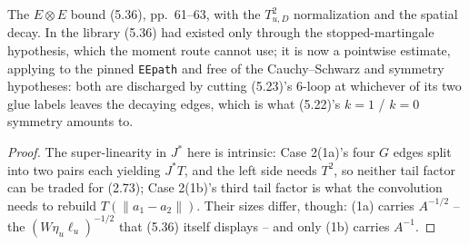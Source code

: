 \begin{lemma}\label{lem:5.7b}
  \leanok{}
  The $E\otimes E$ bound (5.36), pp.\ 61--63, with the $T_{u,D}^2$ normalization and the spatial
  decay.  In the library (5.36) had existed only through the stopped-martingale hypothesis, which
  the moment route cannot use; it is now a pointwise estimate, applying to the pinned
  \texttt{EEpath} and free of the Cauchy--Schwarz and symmetry hypotheses: both are discharged by
  cutting (5.23)'s 6-loop at whichever of its two glue labels leaves the decaying edges, which is
  what (5.22)'s $k=1$ / $k=0$ symmetry amounts to.
\end{lemma}
\begin{proof}\leanok
  The super-linearity in $J^*$ here is intrinsic: Case 2(1a)'s four $G$ edges split into two pairs
  each yielding $J^*T$, and the left side needs $T^2$, so neither tail factor can be traded for
  (2.73); Case 2(1b)'s third tail factor is what the convolution needs to rebuild
  $T(\|a_1-a_2\|)$.  Their sizes differ, though: (1a) carries $A^{-1/2}$ -- the
  $(W\eta_u\ell_u)^{-1/2}$ that (5.36) itself displays -- and only (1b) carries $A^{-1}$.
\end{proof}


